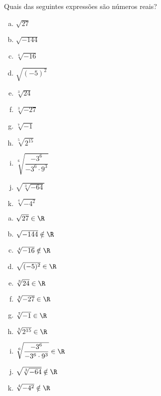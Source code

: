 \begin{exer}
Quais das seguintes expressões são números reais?
\begin{multicols}{2}
\begin{enumerate}[a)]
\item $\sqrt{27}$
\item $\sqrt{-144}$
\item $\sqrt[4]{-16}$
\item $\sqrt{(-5)^2}$
\item $\sqrt[3]{24}$
\item $\sqrt[3]{-27}$
\item $\sqrt[7]{-1}$
\item $\sqrt[5]{2^{15}}$
\item $\sqrt[6]{\dfrac{-3^6}{-3^6 \cdot 9^3}}$
\item $\sqrt{\sqrt[3]{-64}}$
\item $\sqrt[4]{-4^2}$
\end{enumerate}
\end{multicols}
\end{exer}
\begin{resp}
\begin{multicols}{4}
\begin{enumerate}[a)]
\item $\sqrt{27} \in \R$
\item $\sqrt{-144} \notin \R$
\item $\sqrt[4]{-16} \notin \R$
\item $\sqrt{(-5)^2} \in \R$
\item $\sqrt[3]{24} \in \R$
\item $\sqrt[3]{-27} \in \R$
\item $\sqrt[7]{-1} \in \R$
\item $\sqrt[5]{2^{15}} \in \R $
\item $\sqrt[6]{\dfrac{-3^6}{-3^6 \cdot 9^3}} \in \R$
\item $\sqrt{\sqrt[3]{-64}} \notin \R$
\item $\sqrt[4]{-4^2} \notin \R$
\end{enumerate}
\end{multicols}
\end{resp}

